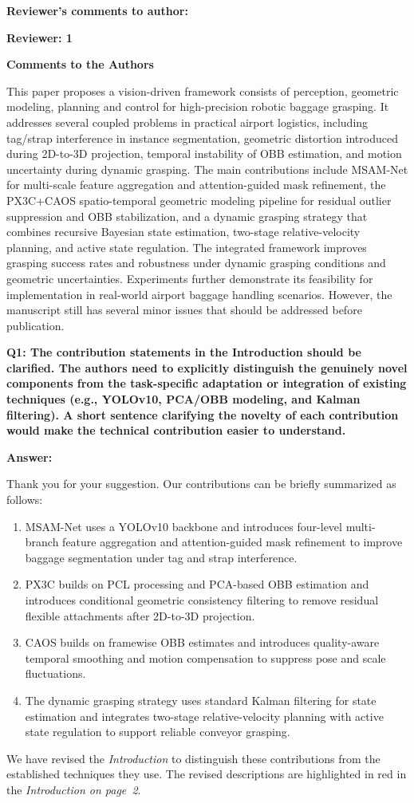 \documentclass[journal,10pt]{IEEEtran}
\newcommand{\reviewer}[1]{%
  \par\smallskip\noindent
  \textcolor{responseblue}{\textbf{#1\hspace{0.2em}}}\par\nobreak%
}
\newcommand{\question}[2]{%
  \par\smallskip\noindent
  {\color{responseblue}\bfseries\clubpenalty=10000\widowpenalty=10000 Q#1: #2\par}%
  \par\nobreak\noindent
}
\newcommand{\answer}{%
  \par\smallskip\noindent
  \textbf{Answer: }\ignorespaces
}
\newcommand{\reviewercomments}{%
  \par\smallskip\noindent
  {\color{responseblue}\bfseries Comments to the Authors\par\nobreak}%
  \noindent\ignorespaces
}
\begin{document}
\reviewer{Reviewer's comments to author:}

\reviewer{Reviewer: 1}

\reviewercomments
This paper proposes a vision-driven framework consists of perception, geometric modeling, planning and control for high-precision robotic baggage grasping. It addresses several coupled problems in practical airport logistics, including tag/strap interference in instance segmentation, geometric distortion introduced during 2D-to-3D projection, temporal instability of OBB estimation, and motion uncertainty during dynamic grasping. The main contributions include MSAM-Net for multi-scale feature aggregation and attention-guided mask refinement, the PX3C+CAOS spatio-temporal geometric modeling pipeline for residual outlier suppression and OBB stabilization, and a dynamic grasping strategy that combines recursive Bayesian state estimation, two-stage relative-velocity planning, and active state regulation. The integrated framework improves grasping success rates and robustness under dynamic grasping conditions and geometric uncertainties. Experiments further demonstrate its feasibility for implementation in real-world airport baggage handling scenarios. However, the manuscript still has several minor issues that should be addressed before publication.

\question{1}{The contribution statements in the Introduction should be clarified. The authors need to explicitly distinguish the genuinely novel components from the task-specific adaptation or integration of existing techniques (e.g., YOLOv10, PCA/OBB modeling, and Kalman filtering). A short sentence clarifying the novelty of each contribution would make the technical contribution easier to understand.}

\answer
Thank you for your suggestion. Our contributions can be briefly summarized as follows:
\begin{enumerate}
\renewcommand{\labelenumi}{\arabic{enumi}.}
\item MSAM-Net uses a YOLOv10 backbone and introduces four-level multi-branch feature aggregation and attention-guided mask refinement to improve baggage segmentation under tag and strap interference.
\item PX3C builds on PCL processing and PCA-based OBB estimation and introduces conditional geometric consistency filtering to remove residual flexible attachments after 2D-to-3D projection.
\item CAOS builds on framewise OBB estimates and introduces quality-aware temporal smoothing and motion compensation to suppress pose and scale fluctuations.
\item The dynamic grasping strategy uses standard Kalman filtering for state estimation and integrates two-stage relative-velocity planning with active state regulation to support reliable conveyor grasping.
\end{enumerate}
We have revised the \textit{Introduction} to distinguish these contributions from the established techniques they use. The revised descriptions are highlighted in red in the \textit{Introduction on page~2}.
\end{document}

